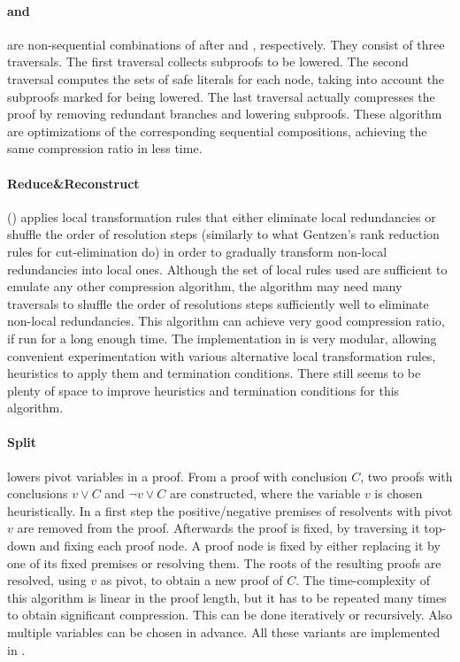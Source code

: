 \documentclass{llncs}
\begin{document}
\paragraph{ and } are non-sequential combinations of  after 
and , respectively. They consist of three traversals. The first traversal collects subproofs to be
lowered. The second traversal computes the sets of safe literals for each node,
taking into account the subproofs marked for being lowered. The last traversal actually compresses the proof by removing redundant branches and lowering subproofs. These algorithm are optimizations of the corresponding sequential compositions, achieving the
same compression ratio in less time. 


\paragraph{Reduce\&Reconstruct} () \cite{RedRec} applies local transformation
rules that either eliminate local redundancies or shuffle the order of resolution steps (similarly to what Gentzen's rank reduction rules for cut-elimination do) in order to gradually transform non-local redundancies into local ones. Although the set of local rules used are sufficient to emulate any
other compression algorithm, the algorithm may need many traversals to shuffle the order of resolutions steps sufficiently well to eliminate non-local redundancies. This algorithm can achieve very good
compression ratio, if run for a long enough time.
%
The implementation in \skeptik is very modular, allowing convenient experimentation with various alternative local transformation rules, heuristics to apply
them and termination conditions. There still seems to be plenty of space to improve heuristics and termination conditions for this algorithm.


\paragraph{Split} \cite{CottonSplit} lowers pivot variables in a proof. 
From a proof with conclusion $C$, two proofs with conclusions $v \vee C$ and $\neg{v} \vee C$ are constructed,  where the variable $v$ is chosen heuristically.
In a first step the positive/negative premises of resolvents with pivot $v$ are removed from the proof.
Afterwards the proof is fixed, by traversing it top-down and fixing each proof node.
A proof node is fixed by either replacing it by one of its fixed premises or resolving them.
The roots of the resulting proofs are resolved, using $v$ as pivot, to obtain a new proof of $C$.
The time-complexity of this algorithm is linear in the proof length, but it has to be repeated many times to obtain significant compression. This can be done iteratively or recursively. Also multiple variables can be chosen in advance. 
All these variants are implemented in {\skeptik}.
\end{document}

